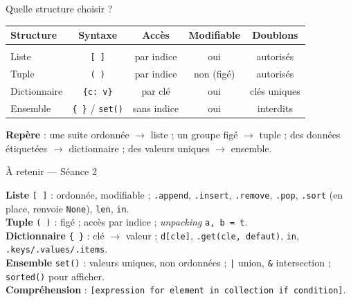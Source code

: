\documentclass[aspectratio=169,11pt]{beamer}
\begin{document}
\begin{frame}{Quelle structure choisir ?}
\begin{center}
\small
\begin{tabular}{l c c c c}
\textbf{Structure} & \textbf{Syntaxe} & \textbf{Accès} & \textbf{Modifiable} & \textbf{Doublons}\\[2pt]
\hline\\[-6pt]
Liste & \texttt{[ ]} & par indice & oui & autorisés\\[2pt]
Tuple & \texttt{( )} & par indice & non (figé) & autorisés\\[2pt]
Dictionnaire & \texttt{\{c: v\}} & par clé & oui & clés uniques\\[2pt]
Ensemble & \texttt{\{ \}} / \texttt{set()} & sans indice & oui & interdits\\
\end{tabular}
\end{center}
\vspace{4pt}
{\small \textbf{Repère} : une suite ordonnée $\rightarrow$ liste ; un groupe figé $\rightarrow$ tuple ; des données étiquetées $\rightarrow$ dictionnaire ; des valeurs uniques $\rightarrow$ ensemble.}
\end{frame}

\begin{frame}{À retenir — Séance 2}
\begin{ucadret}[L'essentiel]
{\small
\textbf{Liste} \texttt{[ ]} : ordonnée, modifiable ; \texttt{.append}, \texttt{.insert}, \texttt{.remove}, \texttt{.pop}, \texttt{.sort} (en place, renvoie \texttt{None}), \texttt{len}, \texttt{in}.\\[2pt]
\textbf{Tuple} \texttt{( )} : figé ; accès par indice ; \emph{unpacking} \texttt{a, b = t}.\\[2pt]
\textbf{Dictionnaire} \texttt{\{ \}} : clé $\rightarrow$ valeur ; \texttt{d[cle]}, \texttt{.get(cle, defaut)}, \texttt{in}, \texttt{.keys/.values/.items}.\\[2pt]
\textbf{Ensemble} \texttt{set()} : valeurs uniques, non ordonnées ; \texttt{|} union, \texttt{\&} intersection ; \texttt{sorted()} pour afficher.\\[2pt]
\textbf{Compréhension} : \texttt{[expression for element in collection if condition]}.}
\end{ucadret}
\end{frame}
\end{document}
